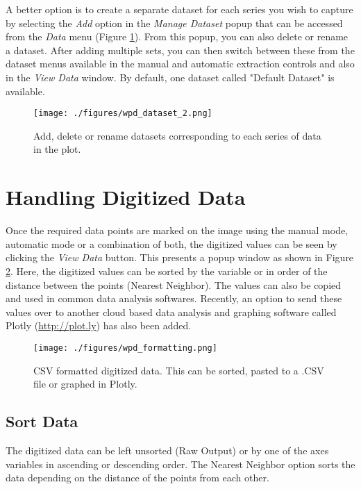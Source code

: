 \documentclass[letterpaper, 10pt]{article}
\begin{document}
A better option is to create a separate dataset for each series you wish to capture by selecting the \emph{Add} option in the \emph{Manage Dataset} popup that can be accessed from the \emph{Data} menu (Figure \ref{fig:manageDatasets}). From this popup, you can also delete or rename a dataset. After adding multiple sets, you can then switch between these from the dataset menus available in the manual and automatic extraction controls and also in the \emph{View Data} window. By default, one dataset called "Default Dataset" is available.
\begin{figure}
\begin{center}
\texttt{[image: ./figures/wpd\_dataset\_2.png]}
\caption{Add, delete or rename datasets corresponding to each series of data in the plot.}
\label{fig:manageDatasets}
\end{center}
\end{figure}

 
\section{Handling Digitized Data}
\label{sec:csvData}
Once the required data points are marked on the image using the manual mode, automatic mode or a combination of both, the digitized values can be seen by clicking the \emph{View Data} button. This presents a popup window as shown in Figure \ref{fig:csvOutput}. Here, the digitized values can be sorted by the variable or in order of the distance between the points (Nearest Neighbor). The values can also be copied and used in common data analysis softwares. Recently, an option to send these values over to another cloud based data analysis and graphing software called Plotly (\url{http://plot.ly}) has also been added.
 
\begin{figure}
\begin{center}
\texttt{[image: ./figures/wpd\_formatting.png]}
\caption{CSV formatted digitized data. This can be sorted, pasted to a .CSV file or graphed in Plotly.}
\label{fig:csvOutput}
\end{center}
\end{figure}
\subsection{Sort Data}
The digitized data can be left unsorted (Raw Output) or by one of the axes variables in ascending or descending order. The Nearest Neighbor option sorts the data depending on the distance of the points from each other.
\end{document}
